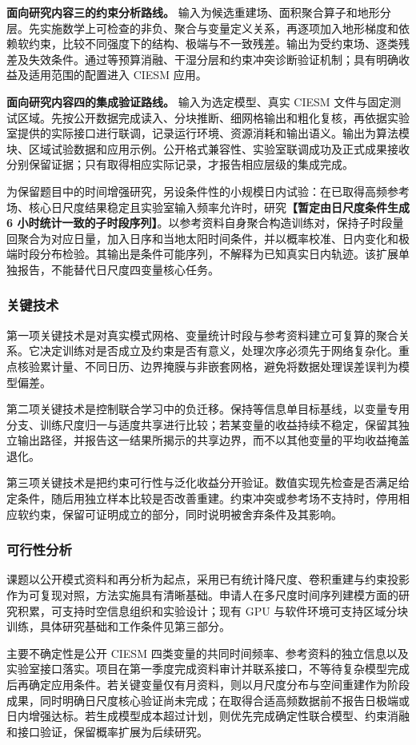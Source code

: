 \textbf{面向研究内容三的约束分析路线。}
输入为候选重建场、面积聚合算子和地形分层。先实施数学上可检查的非负、聚合与变量定义关系，再逐项加入地形梯度和依赖软约束，比较不同强度下的结构、极端与不一致残差。输出为受约束场、逐类残差及失效条件。通过等预算消融、干湿分层和约束冲突诊断验证机制；具有明确收益及适用范围的配置进入 CIESM 应用。

\textbf{面向研究内容四的集成验证路线。}
输入为选定模型、真实 CIESM 文件与固定测试区域。先按公开数据完成读入、分块推断、细网格输出和粗化复核，再依据实验室提供的实际接口进行联调，记录运行环境、资源消耗和输出语义。输出为算法模块、区域试验数据和应用示例。公开格式兼容性、实验室联调成功及正式成果接收分别保留证据；只有取得相应实际记录，才报告相应层级的集成完成。

为保留题目中的时间增强研究，另设条件性的小规模日内试验：在已取得高频参考场、核心日尺度结果稳定且实验室输入频率允许时，研究\textbf{【暂定由日尺度条件生成 6 小时统计一致的子时段序列】}。以参考资料自身聚合构造训练对，保持子时段量回聚合为对应日量，加入日序和当地太阳时间条件，并以概率校准、日内变化和极端时段分布检验。其输出是条件可能序列，不解释为已知真实日内轨迹。该扩展单独报告，不能替代日尺度四变量核心任务。

\subsubsection{关键技术}

第一项关键技术是对真实模式网格、变量统计时段与参考资料建立可复算的聚合关系。它决定训练对是否成立及约束是否有意义，处理次序必须先于网络复杂化。重点核验累计量、不同日历、边界掩膜与非嵌套网格，避免将数据处理误差误判为模型偏差。

第二项关键技术是控制联合学习中的负迁移。保持等信息单目标基线，以变量专用分支、训练尺度归一与适度共享进行比较；若某变量的收益持续不稳定，保留其独立输出路径，并报告这一结果所揭示的共享边界，而不以其他变量的平均收益掩盖退化。

第三项关键技术是把约束可行性与泛化收益分开验证。数值实现先检查是否满足给定条件，随后用独立样本比较是否改善重建。约束冲突或参考场不支持时，停用相应软约束，保留可证明成立的部分，同时说明被舍弃条件及其影响。

\subsubsection{可行性分析}

课题以公开模式资料和再分析为起点，采用已有统计降尺度、卷积重建与约束投影作为可复现对照，方法实施具有清晰基础。申请人在多尺度时间序列建模方面的研究积累，可支持时空信息组织和实验设计；现有 GPU 与软件环境可支持区域分块训练，具体研究基础和工作条件见第三部分。

主要不确定性是公开 CIESM 四类变量的共同时间频率、参考资料的独立信息以及实验室接口落实。项目在第一季度完成资料审计并联系接口，不等待复杂模型完成后再确定应用条件。若关键变量仅有月资料，则以月尺度分布与空间重建作为阶段成果，同时明确日尺度核心验证尚未完成；在取得合适高频数据前不报告日极端或日内增强达标。若生成模型成本超过计划，则优先完成确定性联合模型、约束消融和接口验证，保留概率扩展为后续研究。
